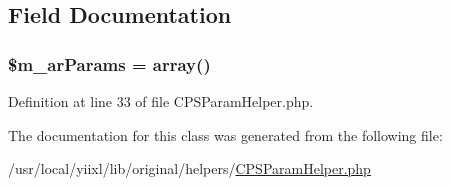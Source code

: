 \subsection{Field Documentation}
\hypertarget{classCPSParamHelper_a81adfd9f391cd4b9ff0f9fedd745e9d1}{
\subsubsection[{\$m\_\-arParams}]{\setlength{\rightskip}{0pt plus 5cm}\$m\_\-arParams = {\bf array}()}}
\label{classCPSParamHelper_a81adfd9f391cd4b9ff0f9fedd745e9d1}


Definition at line 33 of file CPSParamHelper.php.



The documentation for this class was generated from the following file:\begin{DoxyCompactItemize}
\item 
/usr/local/yiixl/lib/original/helpers/\hyperlink{CPSParamHelper_8php}{CPSParamHelper.php}\end{DoxyCompactItemize}
